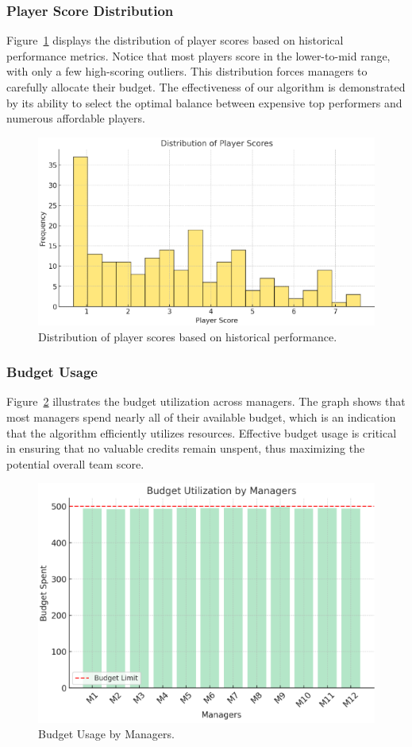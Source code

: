 \documentclass[sigconf]{acmart}
\begin{document}
\subsubsection{Player Score Distribution}
Figure~\ref{fig:player_scores} displays the distribution of player scores based on historical performance metrics. Notice that most players score in the lower-to-mid range, with only a few high-scoring outliers. This distribution forces managers to carefully allocate their budget. The effectiveness of our algorithm is demonstrated by its ability to select the optimal balance between expensive top performers and numerous affordable players.

\begin{figure}[H]
	\centering
	\includegraphics[width=0.8\linewidth]{plot/player_score_distribution.png}
	\caption{Distribution of player scores based on historical performance.}
	\label{fig:player_scores}
\end{figure}

\subsubsection{Budget Usage}
Figure~\ref{fig:budget_usage} illustrates the budget utilization across managers. The graph shows that most managers spend nearly all of their available budget, which is an indication that the algorithm efficiently utilizes resources. Effective budget usage is critical in ensuring that no valuable credits remain unspent, thus maximizing the potential overall team score.

\begin{figure}[H]
	\centering
	\includegraphics[width=0.8\linewidth]{plot/budget_usage.png}
	\caption{Budget Usage by Managers.}
	\label{fig:budget_usage}
\end{figure}
\end{document}
